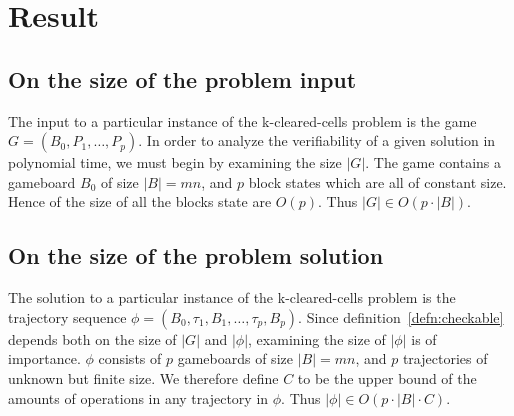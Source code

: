 \section{Result}

\subsection{On the size of the problem input}
The input to a particular instance of the k-cleared-cells problem is the game $G = (B_0, P_1, \ldots, P_p)$. In order to analyze the verifiability of a given solution in polynomial time, we must begin by examining the size $|G|$. The game contains a gameboard $B_0$ of size $|B| = mn$, and $p$ block states which are all of constant size. Hence of the size of all the blocks state are $O(p)$. Thus $|G| \in O(p \cdot |B|)$.

\subsection{On the size of the problem solution}
The solution to a particular instance of the k-cleared-cells problem is the trajectory sequence $\phi=(B_0, \tau_1, B_1, \ldots ,\tau_p, B_p)$. Since definition~\ref{defn:checkable} depends both on the size of $|G|$ and $|\phi|$, examining the size of $|\phi|$ is of importance. $\phi$ consists of $p$ gameboards of size $|B| = mn$, and $p$ trajectories of unknown but finite size. We therefore define $C$ to be the upper bound of the amounts of operations in any trajectory in $\phi$. Thus $|\phi| \in O(p \cdot |B| \cdot C)$.




